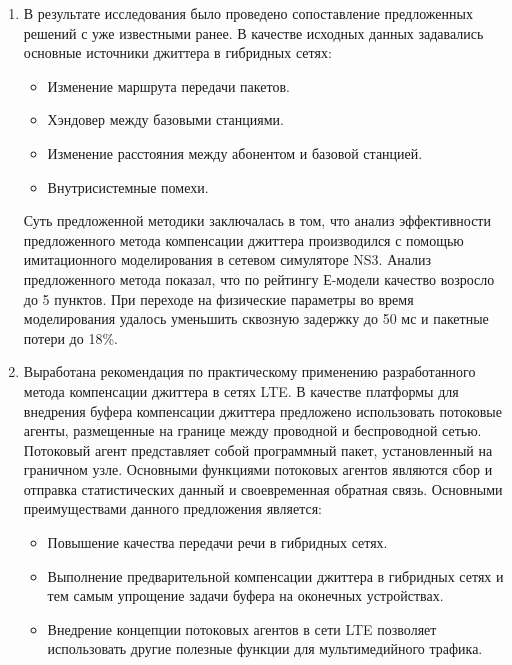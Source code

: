 \begin{enumerate}
 \item %
 В результате исследования было проведено сопоставление предложенных решений с уже известными ранее.
 В качестве исходных данных задавались основные источники джиттера в гибридных сетях:
 \begin{itemize}
  \item Изменение маршрута передачи пакетов.
  \item Хэндовер между базовыми станциями.
  \item Изменение расстояния между абонентом и базовой станцией.
  \item Внутрисистемные помехи.
 \end{itemize}
 Суть предложенной методики заключалась в том, что анализ эффективности предложенного метода компенсации джиттера производился с помощью имитационного моделирования в сетевом симуляторе NS3.
 Анализ предложенного метода показал, что по рейтингу Е-модели качество возросло до 5 пунктов.
 При переходе на физические параметры во время моделирования удалось уменьшить сквозную задержку до 50 мс и пакетные потери до 18\%.
 \item Выработана рекомендация по практическому применению разработанного метода компенсации джиттера в сетях LTE.
 В качестве платформы для внедрения буфера компенсации джиттера предложено использовать потоковые агенты, размещенные на границе между проводной и беспроводной сетью.
 Потоковый агент представляет собой программный пакет, установленный на граничном узле. 
 Основными функциями потоковых агентов являются сбор и отправка статистических данный и своевременная обратная связь.
 Основными преимуществами данного предложения является:
 \begin{itemize}
  \item Повышение качества передачи речи в гибридных сетях.
  \item Выполнение предварительной компенсации джиттера в гибридных сетях и тем самым упрощение задачи буфера на оконечных устройствах.
  \item Внедрение концепции потоковых агентов в сети LTE позволяет использовать другие полезные функции для мультимедийного трафика.
 \end{itemize}

\end{enumerate}




